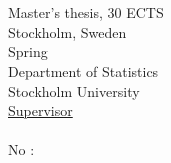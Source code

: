 \makeatletter
{}
\begin{titlepage}
  \AddToShipoutPictureBG*{\AtPageLowerLeft{%
	\color{sublue}\rule{.75\paperwidth}{\paperheight}}}
  \begin{flushright}
   	{\selectfont\color{white}
   	
   	  {\LARGE\@title}\\
   	  \vspace*{5.2cm}
   	  {\Large\@author}\\
   	  \vfill
      {Master's thesis, 30 ECTS}\\
      \vspace*{0.2cm}
      {Stockholm, Sweden}\\
      \vspace*{0.2cm}
      {Spring \thesisyear}\\
      \vfill
      {Department of Statistics}\\
      \vspace{0.2cm}
      {Stockholm University}\\
      \vspace*{2cm}
      {\underline{Supervisor}}\\
      \vspace*{0.2cm}
      {\supervisor}\\
      \vspace*{2cm}
      {\fontsize{18}{22}No \thesisyear:\thesisnumber}\\

    }       
  \end{flushright}
\end{titlepage}
\restoregeometry